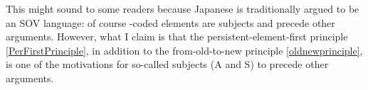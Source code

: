 This might sound  to some readers because Japanese is traditionally argued to be an SOV language:
of course -coded elements are subjects and precede other arguments.
However, what I claim is that
the persistent-element-first principle \ref{PerFirstPrinciple}, in addition to the from-old-to-new principle \ref{oldnewprinciple}, is one of the motivations for so-called subjects (A and S) to precede other arguments.
%

